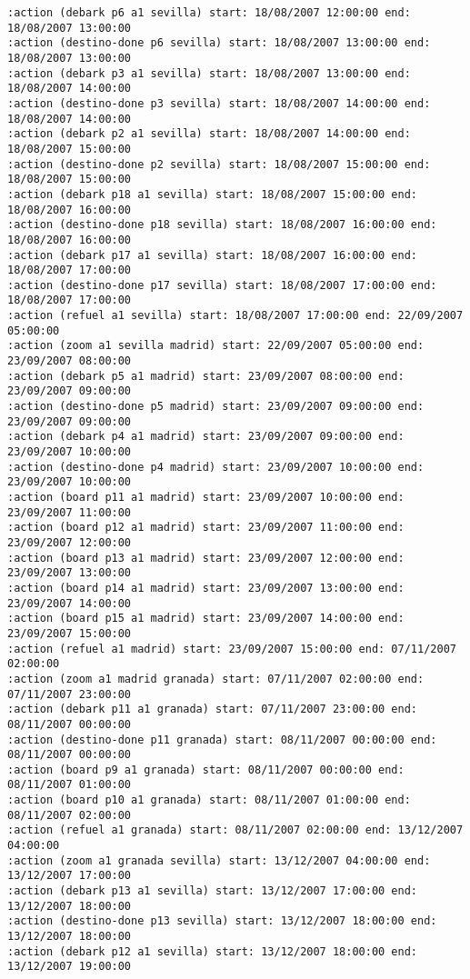 \documentclass{article}
\begin{document}
\begin{lstlisting}
:action (debark p6 a1 sevilla) start: 18/08/2007 12:00:00 end: 18/08/2007 13:00:00
:action (destino-done p6 sevilla) start: 18/08/2007 13:00:00 end: 18/08/2007 13:00:00
:action (debark p3 a1 sevilla) start: 18/08/2007 13:00:00 end: 18/08/2007 14:00:00
:action (destino-done p3 sevilla) start: 18/08/2007 14:00:00 end: 18/08/2007 14:00:00
:action (debark p2 a1 sevilla) start: 18/08/2007 14:00:00 end: 18/08/2007 15:00:00
:action (destino-done p2 sevilla) start: 18/08/2007 15:00:00 end: 18/08/2007 15:00:00
:action (debark p18 a1 sevilla) start: 18/08/2007 15:00:00 end: 18/08/2007 16:00:00
:action (destino-done p18 sevilla) start: 18/08/2007 16:00:00 end: 18/08/2007 16:00:00
:action (debark p17 a1 sevilla) start: 18/08/2007 16:00:00 end: 18/08/2007 17:00:00
:action (destino-done p17 sevilla) start: 18/08/2007 17:00:00 end: 18/08/2007 17:00:00
:action (refuel a1 sevilla) start: 18/08/2007 17:00:00 end: 22/09/2007 05:00:00
:action (zoom a1 sevilla madrid) start: 22/09/2007 05:00:00 end: 23/09/2007 08:00:00
:action (debark p5 a1 madrid) start: 23/09/2007 08:00:00 end: 23/09/2007 09:00:00
:action (destino-done p5 madrid) start: 23/09/2007 09:00:00 end: 23/09/2007 09:00:00
:action (debark p4 a1 madrid) start: 23/09/2007 09:00:00 end: 23/09/2007 10:00:00
:action (destino-done p4 madrid) start: 23/09/2007 10:00:00 end: 23/09/2007 10:00:00
:action (board p11 a1 madrid) start: 23/09/2007 10:00:00 end: 23/09/2007 11:00:00
:action (board p12 a1 madrid) start: 23/09/2007 11:00:00 end: 23/09/2007 12:00:00
:action (board p13 a1 madrid) start: 23/09/2007 12:00:00 end: 23/09/2007 13:00:00
:action (board p14 a1 madrid) start: 23/09/2007 13:00:00 end: 23/09/2007 14:00:00
:action (board p15 a1 madrid) start: 23/09/2007 14:00:00 end: 23/09/2007 15:00:00
:action (refuel a1 madrid) start: 23/09/2007 15:00:00 end: 07/11/2007 02:00:00
:action (zoom a1 madrid granada) start: 07/11/2007 02:00:00 end: 07/11/2007 23:00:00
:action (debark p11 a1 granada) start: 07/11/2007 23:00:00 end: 08/11/2007 00:00:00
:action (destino-done p11 granada) start: 08/11/2007 00:00:00 end: 08/11/2007 00:00:00
:action (board p9 a1 granada) start: 08/11/2007 00:00:00 end: 08/11/2007 01:00:00
:action (board p10 a1 granada) start: 08/11/2007 01:00:00 end: 08/11/2007 02:00:00
:action (refuel a1 granada) start: 08/11/2007 02:00:00 end: 13/12/2007 04:00:00
:action (zoom a1 granada sevilla) start: 13/12/2007 04:00:00 end: 13/12/2007 17:00:00
:action (debark p13 a1 sevilla) start: 13/12/2007 17:00:00 end: 13/12/2007 18:00:00
:action (destino-done p13 sevilla) start: 13/12/2007 18:00:00 end: 13/12/2007 18:00:00
:action (debark p12 a1 sevilla) start: 13/12/2007 18:00:00 end: 13/12/2007 19:00:00

\end{lstlisting}
\end{document}

